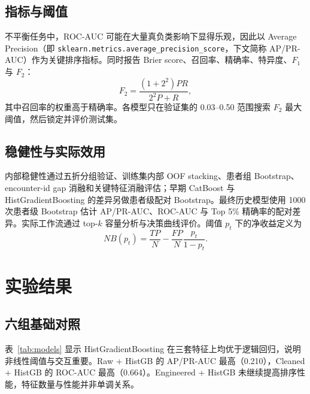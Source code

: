 \documentclass[UTF8,a4paper,11pt,fontset=none]{ctexart}
\begin{document}
\subsection{指标与阈值}

不平衡任务中，ROC-AUC 可能在大量真负类影响下显得乐观，因此以 Average Precision（即 \texttt{sklearn.metrics.average\_precision\_score}，下文简称 AP/PR-AUC）作为关键排序指标\cite{davis2006,saito2015}。同时报告 Brier score\cite{brier1950}、召回率、精确率、特异度、$F_1$ 与 $F_2$\cite{powers2011}：
\begin{equation}
 F_2 = \frac{(1+2^2)PR}{2^2P+R},
\end{equation}
其中召回率的权重高于精确率。各模型只在验证集的 0.03--0.50 范围搜索 $F_2$ 最大阈值，然后锁定并评价测试集。

\subsection{稳健性与实际效用}

内部稳健性通过五折分组验证、训练集内部 OOF stacking、患者组 Bootstrap、encounter-id gap 消融和关键特征消融评估；早期 CatBoost 与 HistGradientBoosting 的差异另做患者级配对 Bootstrap\cite{kohavi1995,efron1993}。最终历史模型使用 1000 次患者级 Bootstrap 估计 AP/PR-AUC、ROC-AUC 与 Top 5\% 精确率的配对差异。实际工作流通过 top-$k$ 容量分析与决策曲线评价。阈值 $p_t$ 下的净收益定义为\cite{vickers2006}
\begin{equation}
 NB(p_t)=\frac{TP}{N}-\frac{FP}{N}\frac{p_t}{1-p_t}.
\end{equation}

\section{实验结果}

\subsection{六组基础对照}

表~\ref{tab:models} 显示 HistGradientBoosting 在三套特征上均优于逻辑回归，说明非线性阈值与交互重要。Raw + HistGB 的 AP/PR-AUC 最高（0.210），Cleaned + HistGB 的 ROC-AUC 最高（0.664）。Engineered + HistGB 未继续提高排序性能，特征数量与性能并非单调关系。
\end{document}
